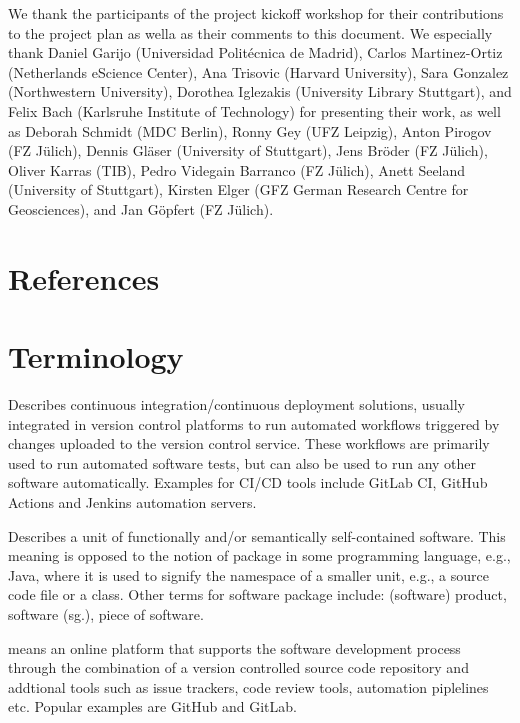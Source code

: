 \documentclass{article}
\begin{document}
We thank the participants of the project kickoff workshop for their contributions to the project plan as wella as their comments to this document. We especially thank Daniel Garijo (Universidad Politécnica de Madrid), Carlos Martinez-Ortiz (Netherlands eScience Center), Ana Trisovic (Harvard University), Sara Gonzalez (Northwestern University), Dorothea Iglezakis (University Library Stuttgart), and Felix Bach (Karlsruhe Institute of Technology) for presenting their work, as well as Deborah Schmidt (MDC Berlin), Ronny Gey (UFZ Leipzig), Anton Pirogov (FZ Jülich), Dennis Gläser (University of Stuttgart), Jens Bröder (FZ Jülich), Oliver Karras (TIB), Pedro Videgain Barranco (FZ Jülich), Anett Seeland (University of Stuttgart), Kirsten Elger (GFZ German Research Centre for Geosciences), and Jan Göpfert (FZ Jülich).



\section{References}\label{yn9p9iv7jdw}




\section{Terminology}\label{urp18u0}


\label{qo8o3ddicwv8}
Describes continuous integration/continuous deployment solutions, usually integrated in version control platforms to run automated workflows triggered by changes uploaded to the version control service. These workflows are primarily used to run automated software tests, but can also be used to run any other software automatically. Examples for CI/CD tools include GitLab CI, GitHub Actions and Jenkins automation servers.



\label{ryblo0s6xdu}
Describes a unit of functionally and/or semantically self-contained software. This meaning is opposed to the notion of package in some programming language, e.g., Java, where it is used to signify the namespace of a smaller unit, e.g., a source code file or a class. Other terms for software package include: (software) product, software (sg.), piece of software.



\label{sr1ngka3xwwa}
means an online platform that supports the software development process through the combination of a version controlled source code repository and addtional tools such as issue trackers, code review tools, automation piplelines etc. Popular examples are GitHub and GitLab.
\end{document}
